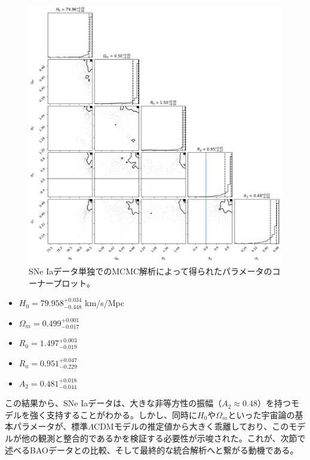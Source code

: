 \documentclass[a4paper,12pt]{article}
\begin{document}
\begin{figure}[H]
    \centering
    \includegraphics[width=\linewidth]{S2_MCMC_analysis_of_SNe_Ia_alone.png}
    \caption{SNe Iaデータ単独でのMCMC解析によって得られたパラメータのコーナープロット。}
    \label{fig:supp_mcmc_sne_only}
\end{figure}

\begin{itemize}
    \item $H_0 = 79.958 ^{+0.034} _{-0.448}$ km/s/Mpc
    \item $\Omega_m = 0.499 ^{+0.001} _{-0.017}$
    \item $R_0 = 1.497 ^{+0.003} _{-0.019}$
    \item $R_a = 0.951 ^{+0.047} _{-0.229}$
    \item $A_2 = 0.481 ^{+0.018} _{-0.044}$
\end{itemize}

この結果から、SNe Iaデータは、大きな非等方性の振幅（$A_2 \approx 0.48$）を持つモデルを強く支持することがわかる。しかし、同時に$H_0$や$\Omega_m$といった宇宙論の基本パラメータが、標準$\Lambda$CDMモデルの推定値から大きく乖離しており、このモデルが他の観測と整合的であるかを検証する必要性が示唆された。これが、次節で述べるBAOデータとの比較、そして最終的な統合解析へと繋がる動機である。
\end{document}
